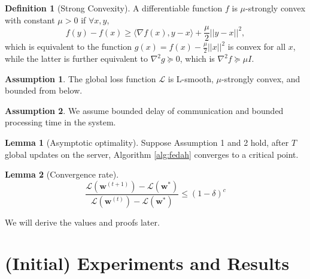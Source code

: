 \documentclass[10pt,twocolumn,letterpaper]{article}
\theoremstyle{definition}
\newtheorem{definition}{Definition}
\newtheorem{assumption}{Assumption}
\newtheorem{lemma}{Lemma}
\begin{document}
\begin{definition}[Strong Convexity]
A differentiable function $f$ is $\mu$-strongly convex with constant $\mu > 0$ if $\forall x, y$, 
\[ f(y) - f(x) \ge \langle \nabla f(x), y-x \rangle + \frac{\mu}{2} ||y-x||^2, \]
which is equivalent to the function $g(x) = f(x)-\frac{\mu}{2}||x||^2$ is convex for all $x$, while the latter is further equivalent to $\nabla ^2 g \succeq 0$, which is $\nabla ^2 f \succeq \mu I$.
\end{definition}

\begin{assumption}
The global loss function $\mathcal{L}$ is L-smooth, $\mu$-strongly convex, and bounded from below.  
\end{assumption}
\begin{assumption}
We assume bounded delay of communication and bounded processing time in the system.
\end{assumption}

\begin{lemma}[Asymptotic optimality]
Suppose Assumption 1 and 2 hold, after $T$ global updates on the server, Algorithm \ref{alg:fedah} converges to a critical point. 
\end{lemma}

\begin{lemma}[Convergence rate]
\[ \frac{ \mathcal{L}(\mathbf{w}^{(t+1)}) - \mathcal{L}(\mathbf{w}^\ast)  }{\mathcal{L}(\mathbf{w}^{(t)}) - \mathcal{L}(\mathbf{w}^\ast) } \le (1-\delta)^c \]
\end{lemma}

We will derive the values and proofs later.

\section{(Initial) Experiments and Results}
\end{document}
